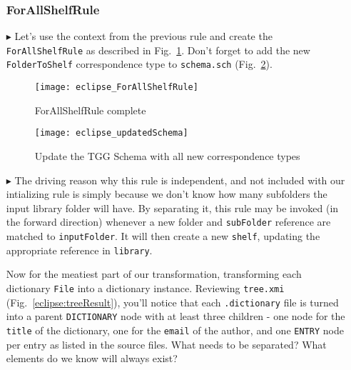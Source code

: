 \begin{itemize}
\subsubsection{ForAllShelfRule} %

\item[$\blacktriangleright$] Let's use the context from the previous rule and create the \texttt{ForAllShelfRule} as described in 
Fig.~\ref{eclipse:ForAllShelvesRule}. Don't forget to add the new \texttt{FolderToShelf} correspondence type to \texttt{schema.sch} 
(Fig.~\ref{eclipse:updatedSchema}).

\vspace{0.5cm}

\begin{figure}[htbp]
\begin{center}
  \texttt{[image: eclipse\_ForAllShelfRule]}
  \caption{ForAllShelfRule complete}
  \label{eclipse:ForAllShelvesRule}
\end{center}
\end{figure}

\begin{figure}[htbp]
\begin{center}
  \texttt{[image: eclipse\_updatedSchema]}
  \caption{Update the TGG Schema with all new correspondence types}
  \label{eclipse:updatedSchema}
\end{center}
\end{figure}

\item[$\blacktriangleright$] The driving reason why this rule is independent, and not included with our intializing rule is simply because we don't know how
many subfolders the input library folder will have. By separating it, this rule may be invoked (in the forward direction) whenever a new folder and
\texttt{subFolder} reference are matched to \texttt{inputFolder}. It will then create a new \texttt{shelf}, updating the appropriate reference in
\texttt{library}.

\vspace{0.5cm}

Now for the meatiest part of our transformation, transforming each dictionary \texttt{File} into a dictionary instance. Reviewing \texttt{tree.xmi}
(Fig.~\ref{eclipse:treeResult}), you'll notice that each \texttt{.dictionary} file is turned into a parent \texttt{DICTIONARY} node with at least three children
- one node for the \texttt{title} of the dictionary, one for the \texttt{email} of the author, and one \texttt{ENTRY} node per entry as listed in the source
files. What needs to be separated? What elements do we know will always exist? 


\end{itemize}
